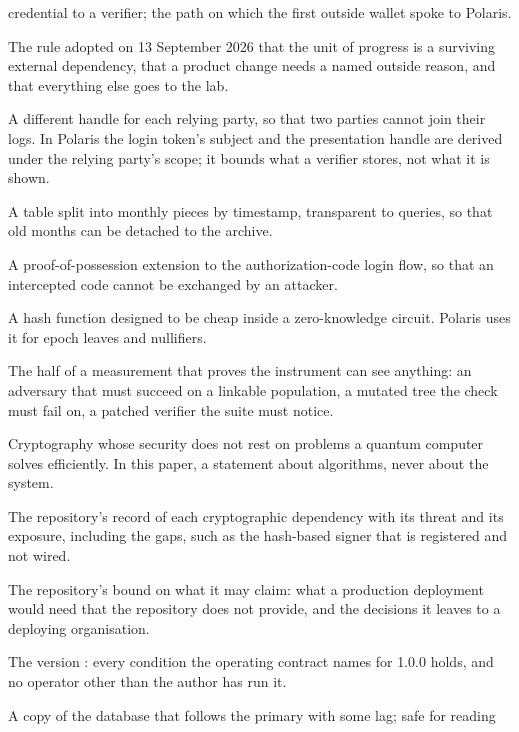 \begin{description}
    credential to a verifier; the path on which the first outside wallet spoke to Polaris.
  \item[Operating contract.] The rule adopted on 13 September 2026 that the unit of progress is a
    surviving external dependency, that a product change needs a named outside reason, and that
    everything else goes to the lab.
  \item[Pairwise identifier.] A different handle for each relying party, so that two parties cannot
    join their logs. In Polaris the login token's subject and the presentation handle are derived
    under the relying party's scope; it bounds what a verifier stores, not what it is shown.
  \item[Partition.] A table split into monthly pieces by timestamp, transparent to queries, so that
    old months can be detached to the archive.
  \item[PKCE.] A proof-of-possession extension to the authorization-code login flow, so that an
    intercepted code cannot be exchanged by an attacker.
  \item[Poseidon.] A hash function designed to be cheap inside a zero-knowledge circuit. Polaris uses it for
    epoch leaves and nullifiers.
  \item[Positive control.] The half of a measurement that proves the instrument can see anything: an
    adversary that must succeed on a linkable population, a mutated tree the check must fail on, a
    patched verifier the suite must notice.
  \item[Post-quantum.] Cryptography whose security does not rest on problems a quantum computer
    solves efficiently. In this paper, a statement about algorithms, never about the system.
  \item[Posture ledger.] The repository's record of each cryptographic dependency with its threat and its
    exposure, including the gaps, such as the hash-based signer that is registered and not wired.
  \item[Readiness ledger.] The repository's bound on what it may claim: what a production deployment would need
    that the repository does not provide, and the decisions it leaves to a deploying organisation.
  \item[Release candidate.] The version : every condition the operating contract
    names for 1.0.0 holds, and no operator other than the author has run it.
  \item[Replica.] A copy of the database that follows the primary with some lag; safe for reading

\end{description}
